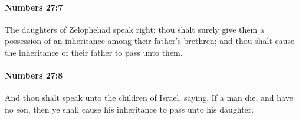 		\paragraph{Numbers 27:7} %
			\label{NUMBERS-27-7}

			The daughters of Zelophehad speak right: thou shalt surely give them a possession of an inheritance among their father’s brethren; and thou shalt cause the inheritance of their father to pass unto them.


		\paragraph{Numbers 27:8} %
			\label{NUMBERS-27-8}

			And thou shalt speak unto the children of Israel, saying, If a man die, and have no son, then ye shall cause his inheritance to pass unto his daughter.



